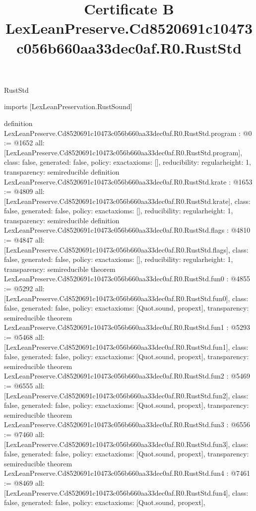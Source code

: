 \begin{lexlean}{RustStd}
\title{Certificate B LexLeanPreserve.Cd8520691c10473c056b660aa33dec0af.R0.RustStd}
\begin{coremodule}
imports [LexLeanPreservation.RustSound]

definition LexLeanPreserve.Cd8520691c10473c056b660aa33dec0af.R0.RustStd.program : @0 := @1652 {
  all: [LexLeanPreserve.Cd8520691c10473c056b660aa33dec0af.R0.RustStd.program],
  class: false,
  generated: false,
  policy: exact{axioms: []},
  reducibility: regular{height: 1},
  transparency: semireducible
}
definition LexLeanPreserve.Cd8520691c10473c056b660aa33dec0af.R0.RustStd.krate : @1653 := @4809 {
  all: [LexLeanPreserve.Cd8520691c10473c056b660aa33dec0af.R0.RustStd.krate],
  class: false,
  generated: false,
  policy: exact{axioms: []},
  reducibility: regular{height: 1},
  transparency: semireducible
}
definition LexLeanPreserve.Cd8520691c10473c056b660aa33dec0af.R0.RustStd.flags : @4810 := @4847 {
  all: [LexLeanPreserve.Cd8520691c10473c056b660aa33dec0af.R0.RustStd.flags],
  class: false,
  generated: false,
  policy: exact{axioms: []},
  reducibility: regular{height: 1},
  transparency: semireducible
}
theorem LexLeanPreserve.Cd8520691c10473c056b660aa33dec0af.R0.RustStd.fun0 : @4855 := @5292 {
  all: [LexLeanPreserve.Cd8520691c10473c056b660aa33dec0af.R0.RustStd.fun0],
  class: false,
  generated: false,
  policy: exact{axioms: [Quot.sound, propext]},
  transparency: semireducible
}
theorem LexLeanPreserve.Cd8520691c10473c056b660aa33dec0af.R0.RustStd.fun1 : @5293 := @5468 {
  all: [LexLeanPreserve.Cd8520691c10473c056b660aa33dec0af.R0.RustStd.fun1],
  class: false,
  generated: false,
  policy: exact{axioms: [Quot.sound, propext]},
  transparency: semireducible
}
theorem LexLeanPreserve.Cd8520691c10473c056b660aa33dec0af.R0.RustStd.fun2 : @5469 := @6555 {
  all: [LexLeanPreserve.Cd8520691c10473c056b660aa33dec0af.R0.RustStd.fun2],
  class: false,
  generated: false,
  policy: exact{axioms: [Quot.sound, propext]},
  transparency: semireducible
}
theorem LexLeanPreserve.Cd8520691c10473c056b660aa33dec0af.R0.RustStd.fun3 : @6556 := @7460 {
  all: [LexLeanPreserve.Cd8520691c10473c056b660aa33dec0af.R0.RustStd.fun3],
  class: false,
  generated: false,
  policy: exact{axioms: [Quot.sound, propext]},
  transparency: semireducible
}
theorem LexLeanPreserve.Cd8520691c10473c056b660aa33dec0af.R0.RustStd.fun4 : @7461 := @8469 {
  all: [LexLeanPreserve.Cd8520691c10473c056b660aa33dec0af.R0.RustStd.fun4],
  class: false,
  generated: false,
  policy: exact{axioms: [Quot.sound, propext]},
}
\end{coremodule}
\end{lexlean}
